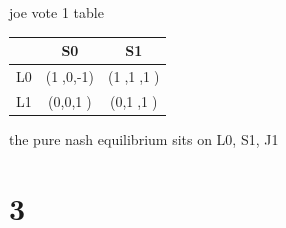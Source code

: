 \documentclass{article}
\begin{document}
joe vote 1 table
\begin{table}[h!]
\centering
\begin{tabular}{c|c c}
\toprule
 & S0 & S1 \\
\midrule
L0 & (\textcircled{1},0,-1) & (\textcircled{1},\textcircled{1},\textcircled{1}) \\
L1 & (0,0,\textcircled{1}) & (0,\textcircled{1},\textcircled{1}) \\
\bottomrule
\end{tabular}

\end{table}



the pure nash equilibrium sits on L0, S1, J1



\newpage
\section{3}
\end{document}

